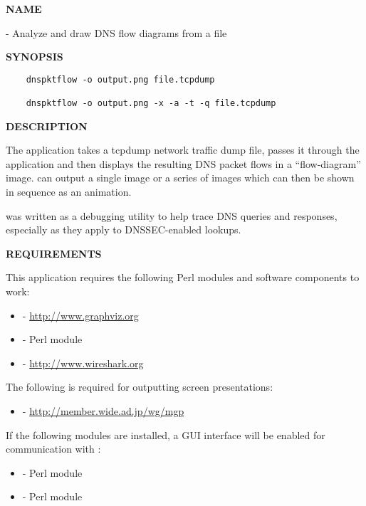 \clearpage

\subsubsection{}

{\bf NAME}

 - Analyze and draw DNS flow diagrams from a  file

{\bf SYNOPSIS}

\begin{verbatim}
    dnspktflow -o output.png file.tcpdump

    dnspktflow -o output.png -x -a -t -q file.tcpdump
\end{verbatim}

{\bf DESCRIPTION}

The  application takes a tcpdump network traffic dump
file, passes it through the  application and then displays the
resulting DNS packet flows in a ``flow-diagram'' image.  
can output a single image or a series of images which can then be
shown in sequence as an animation.

 was written as a debugging utility to help trace DNS
queries and responses, especially as they apply to DNSSEC-enabled lookups.

{\bf REQUIREMENTS}

This application requires the following Perl modules and software
components to work:

\begin{itemize}
\item {} - \url{http://www.graphviz.org}
\item {} - Perl module
\item {}   - \url{http://www.wireshark.org}
\end{itemize}

The following is required for outputting screen presentations:

\begin{itemize}
\item {} - \url{http://member.wide.ad.jp/wg/mgp}
\end{itemize}

If the following modules are installed, a GUI interface will be enabled for
communication with :

\begin{itemize}
\item {} - Perl module
\item {} - Perl module
\end{itemize}

